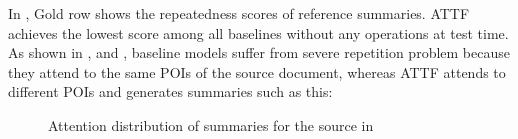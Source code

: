 In , Gold row shows the repeatedness scores of
reference summaries. ATTF achieves the lowest
score among all baselines without any operations at test time. 
As shown in ,  and ,
baseline models suffer from severe repetition problem because they attend to the same POIs 
of the source document, whereas 
ATTF attends to different POIs and generates summaries 
such as this:


\begin{figure}[th!]
\centering
{}
\quad
{}
\quad
{}
\quad
{}
\quad
{}
\quad
{}
\caption{Attention distribution of summaries for the source in }
\label{fig:attn_maps}
\end{figure}

